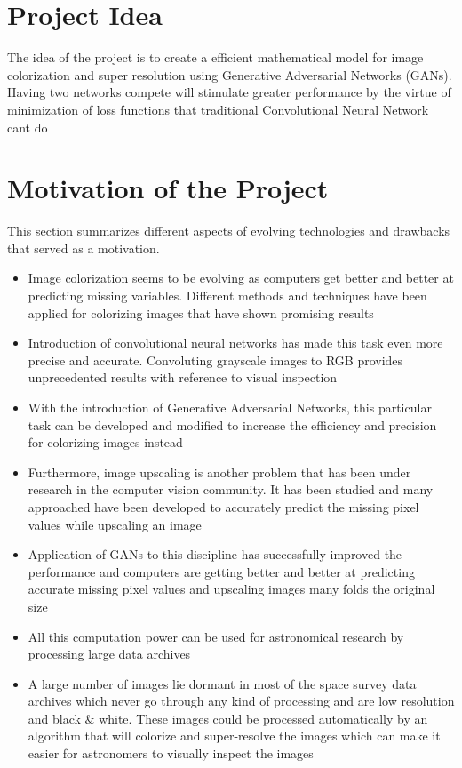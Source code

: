 \documentclass[oneside,a4paper,12pt]{report}
\begin{document}
\section{Project Idea}

\hspace*{0.25 in}The idea of the project is to create a efficient mathematical model for image colorization and super resolution using Generative Adversarial Networks (GANs).\\
\hspace*{0.25 in}Having two networks compete will stimulate greater performance by the virtue of minimization of loss functions that traditional Convolutional Neural Network cant do


\section{Motivation of the Project}
\hspace*{0.25 in}This section summarizes different aspects of evolving technologies and drawbacks that served as a motivation.
\begin{itemize}
\item Image colorization seems to be evolving as computers get better and better at predicting missing variables. Different methods and techniques have been applied for colorizing images that have shown promising results
\item Introduction of convolutional neural networks has made this task even more precise and accurate. Convoluting grayscale images to RGB provides unprecedented results with reference to visual inspection
\item With the introduction of Generative Adversarial Networks, this particular task can be developed and modified to increase the efficiency and precision for colorizing images instead
\item Furthermore, image upscaling is another problem that has been under research in the computer vision community. It has been studied and many approached have been developed to accurately predict the missing pixel values while upscaling an image
\item Application of GANs to this discipline has successfully improved the performance and computers are getting better and better at predicting accurate missing pixel values and upscaling images many folds the original size
\item All this computation power can be used for astronomical research by processing large data archives
\item A large number of images lie dormant in most of the space survey data archives which never go through any kind of processing and are low resolution and black \& white. These images could be processed automatically by an algorithm that will colorize and super-resolve the images which can make it easier for astronomers to visually inspect the images
\end{itemize}
\end{document}
